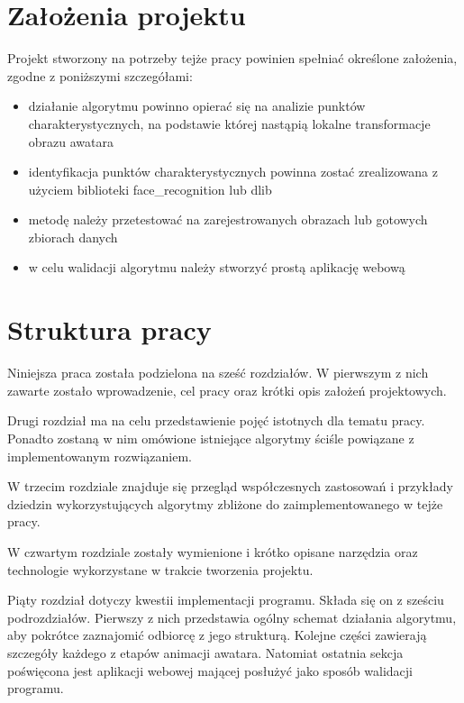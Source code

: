 
\section{Założenia projektu}
\label{sec:zalozeniaProjektu}
Projekt stworzony na potrzeby tejże pracy powinien spełniać określone założenia, zgodne z poniższymi szczegółami:
\begin{itemize}
    \item działanie algorytmu powinno opierać się na analizie punktów charakterystycznych, na podstawie której nastąpią lokalne transformacje obrazu awatara
    \item identyfikacja punktów charakterystycznych powinna zostać zrealizowana z użyciem biblioteki face\_recognition lub dlib
    \item metodę należy przetestować na zarejestrowanych obrazach lub gotowych zbiorach danych
    \item w celu walidacji algorytmu należy stworzyć prostą aplikację webową
\end{itemize}


\section{Struktura pracy}
\label{sec:strukturaPracy}
Niniejsza praca została podzielona na sześć rozdziałów. W pierwszym z nich zawarte zostało wprowadzenie, cel pracy oraz krótki opis założeń projektowych.

Drugi rozdział ma na celu przedstawienie pojęć istotnych dla tematu pracy. Ponadto zostaną w nim omówione istniejące algorytmy ściśle powiązane z implementowanym rozwiązaniem. 

W trzecim rozdziale znajduje się przegląd współczesnych zastosowań i przykłady dziedzin wykorzystujących algorytmy zbliżone do zaimplementowanego w tejże pracy. 

W czwartym rozdziale zostały wymienione i krótko opisane narzędzia oraz technologie wykorzystane w trakcie tworzenia projektu.

Piąty rozdział dotyczy kwestii implementacji programu. Składa się on z sześciu podrozdziałów. Pierwszy z nich przedstawia ogólny schemat działania algorytmu, aby pokrótce zaznajomić odbiorcę z jego strukturą. Kolejne części zawierają szczegóły każdego z etapów animacji awatara. Natomiat ostatnia sekcja poświęcona jest aplikacji webowej mającej posłużyć jako sposób walidacji programu.

